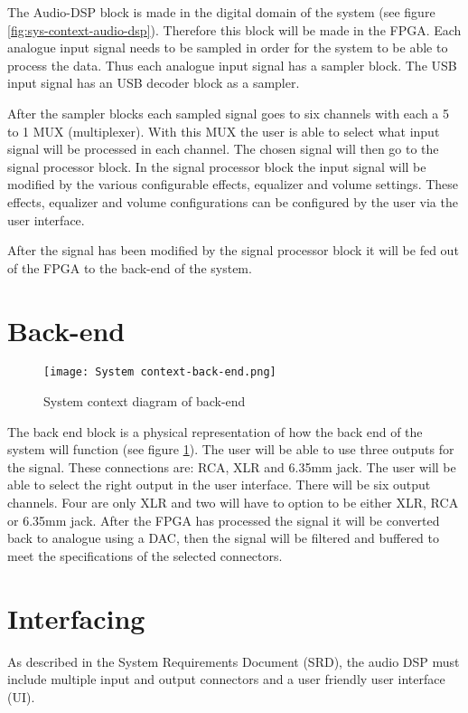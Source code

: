 The Audio-DSP block is made in the digital domain of the system (see figure \ref{fig:sys-context-audio-dsp}). Therefore this block will be made in the FPGA. Each analogue input signal needs to be sampled in order for the system to be able to process the data. Thus each analogue input signal has a sampler block. The USB input signal has an USB decoder block as a sampler. 

After the sampler blocks each sampled signal goes to six channels with each a 5 to 1 MUX (multiplexer). With this MUX the user is able to select what input signal will be processed in each channel. The chosen signal will then go to the signal processor block. In the signal processor block the input signal will be modified by the various configurable effects, equalizer and volume settings. These effects, equalizer and volume configurations can be configured by the user via the user interface.

After the signal has been modified by the signal processor block it will be fed out of the FPGA to the back-end of the system.

\section{Back-end}
\begin{figure}[ht]
    \texttt{[image: System context-back-end.png]}
    \caption{System context diagram of back-end}
    \label{fig:system-context-back-end}
\end{figure}

The back end block is a physical representation of how the back end of the system will function (see figure \ref{fig:system-context-back-end}). The user will be able to use three outputs for the signal. These connections are: RCA, XLR and 6.35mm jack. The user will be able to select the right output in the user interface. There will be six output channels. Four are only XLR and two will have to option to be either XLR, RCA or 6.35mm jack. After the FPGA has processed the signal it will be converted back to analogue using a DAC, then the signal will be filtered and buffered to meet the specifications of the selected connectors.

\section{Interfacing}
As described in the System Requirements Document (SRD), the audio DSP must include multiple input and output connectors and a user friendly user interface (UI).

